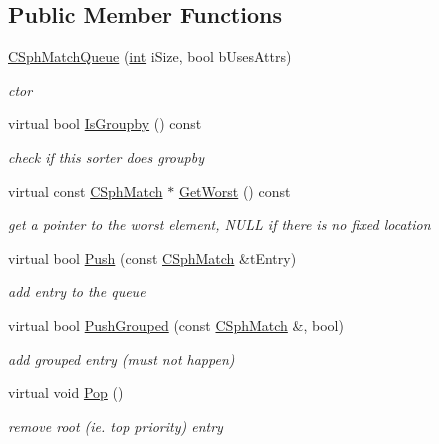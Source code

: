 \subsection*{Public Member Functions}
\begin{DoxyCompactItemize}
\item 
\hyperlink{classCSphMatchQueue_ac7878d123995bf2382563471bfaee493}{C\-Sph\-Match\-Queue} (\hyperlink{sphinxexpr_8cpp_a4a26e8f9cb8b736e0c4cbf4d16de985e}{int} i\-Size, bool b\-Uses\-Attrs)
\begin{DoxyCompactList}\small\item\em ctor \end{DoxyCompactList}\item 
virtual bool \hyperlink{classCSphMatchQueue_a7e13a3a98146b887606119df9c6a1a5c}{Is\-Groupby} () const 
\begin{DoxyCompactList}\small\item\em check if this sorter does groupby \end{DoxyCompactList}\item 
virtual const \hyperlink{classCSphMatch}{C\-Sph\-Match} $\ast$ \hyperlink{classCSphMatchQueue_af24e8fe8977e2cc4bab34a395511a863}{Get\-Worst} () const 
\begin{DoxyCompactList}\small\item\em get a pointer to the worst element, N\-U\-L\-L if there is no fixed location \end{DoxyCompactList}\item 
virtual bool \hyperlink{classCSphMatchQueue_aee1ed20b718996ad390c246d6a8ffe53}{Push} (const \hyperlink{classCSphMatch}{C\-Sph\-Match} \&t\-Entry)
\begin{DoxyCompactList}\small\item\em add entry to the queue \end{DoxyCompactList}\item 
virtual bool \hyperlink{classCSphMatchQueue_a8c6bf819aa2a99a6cb3461d4254ba5b6}{Push\-Grouped} (const \hyperlink{classCSphMatch}{C\-Sph\-Match} \&, bool)
\begin{DoxyCompactList}\small\item\em add grouped entry (must not happen) \end{DoxyCompactList}\item 
virtual void \hyperlink{classCSphMatchQueue_a91df367a6c82d3d03526c83358a5c87c}{Pop} ()
\begin{DoxyCompactList}\small\item\em remove root (ie. top priority) entry \end{DoxyCompactList}\item 

\end{DoxyCompactItemize}
